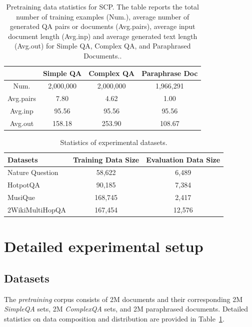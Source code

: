 \documentclass{applemlr}
\numberwithin{equation}{section}
\begin{document}
\begin{table}[H]
    \centering
    \begin{tabular}{c|ccc}
    \bottomrule
         &Simple QA&Complex QA & Paraphrase Doc   \\
         \hline 
         Num. &2,000,000&2,000,000 &1,966,291 \\
         Avg.pairs& 7.80&4.62&1.00 \\
         Avg.inp &95.56&95.56&95.56 \\
         Avg.out &158.18&253.90&108.67 \\
    \toprule
    \end{tabular}
    \caption{Pretraining data statistics for SCP. %
    The table reports the total number of training examples (Num.), average number of generated QA pairs or documents (Avg.pairs),  average input document length (Avg.inp) and  average generated text length (Avg.out) for Simple QA, Complex QA, and Paraphrased Documents..
}
    \label{tab:pretraining_data}
\end{table}
\begin{table}[H]
\centering
\footnotesize
\begin{tabular}{lcc}
\toprule
Datasets &
Training Data Size &
Evaluation Data Size \\
\midrule
Nature Question & 58,622 &  6,489 \\
HotpotQA & 90,185 &  7,384 \\
MusiQue  & 168,745 & 2,417  \\
2WikiMultiHopQA & 167,454  & 12,576 \\
\bottomrule
\end{tabular}
\caption{\centering Statistics of   experimental datasets.}
\label{tab:benchmarks}
\end{table}
\section{Detailed experimental setup}
\label{app:ex_setup}
\subsection{Datasets}




The \textit{pretraining} corpus consists of 2M documents and their corresponding 2M \textit{SimpleQA} sets, 
2M \textit{ComplexQA} sets, and 2M paraphrased documents. 
Detailed statistics on data composition and distribution are provided in Table~\ref{tab:pretraining_data}.
\end{document}
